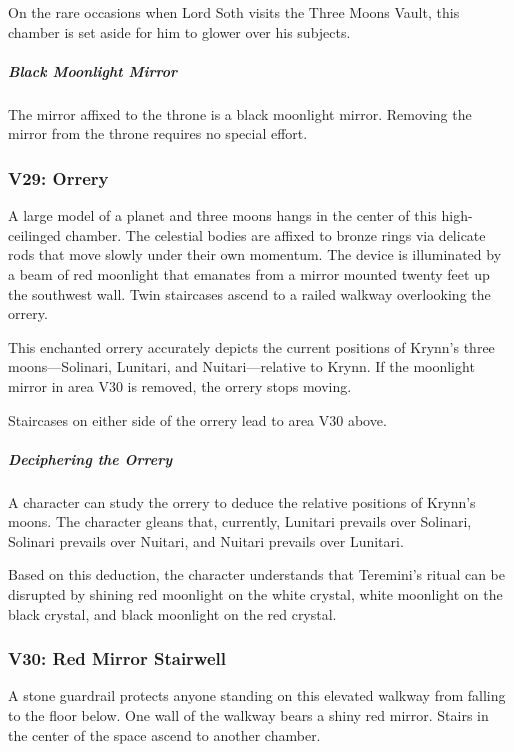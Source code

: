 \documentclass[10pt,a4paper,twoside,bg=print,twocolumn,openany,nodeprecatedcode]{dndbook}
\begin{document}
On the rare occasions when Lord Soth visits the Three Moons Vault, this chamber is set aside for him to glower over his subjects.

\subparagraph{Black Moonlight Mirror}
The mirror affixed to the throne is a black moonlight mirror. Removing the mirror from the throne requires no special effort.

\subsubsection{V29: Orrery}
\begin{DndReadAloud}{}
A large model of a planet and three moons hangs in the center of this high-ceilinged chamber. The celestial bodies are affixed to bronze rings via delicate rods that move slowly under their own momentum. The device is illuminated by a beam of red moonlight that emanates from a mirror mounted twenty feet up the southwest wall. Twin staircases ascend to a railed walkway overlooking the orrery.

\end{DndReadAloud}

This enchanted orrery accurately depicts the current positions of Krynn's three moons—Solinari, Lunitari, and Nuitari—relative to Krynn. If the moonlight mirror in area V30 is removed, the orrery stops moving.

Staircases on either side of the orrery lead to area V30 above.

\subparagraph{Deciphering the Orrery}
A character can study the orrery to deduce the relative positions of Krynn's moons. The character gleans that, currently, Lunitari prevails over Solinari, Solinari prevails over Nuitari, and Nuitari prevails over Lunitari.

Based on this deduction, the character understands that Teremini's ritual can be disrupted by shining red moonlight on the white crystal, white moonlight on the black crystal, and black moonlight on the red crystal.

\subsubsection{V30: Red Mirror Stairwell}
\begin{DndReadAloud}{}
A stone guardrail protects anyone standing on this elevated walkway from falling to the floor below. One wall of the walkway bears a shiny red mirror. Stairs in the center of the space ascend to another chamber.

\end{DndReadAloud}
\end{document}
